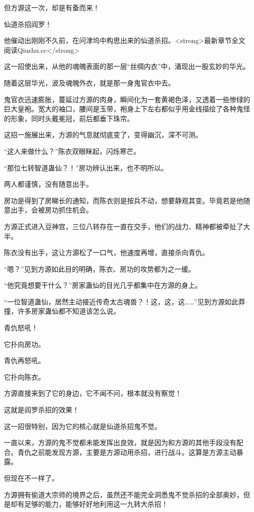 \begin{this_body}
但方源这一次，却是有备而来！

仙道杀招阎罗！

他催动出刚刚不久前，在问津坞中构思出来的仙道杀招。<strong>最新章节全文阅读Qiushu.cc</strong>

这一招使出来，从他的魂魄表面的那一层“丝绸内衣”中，涌现出一股玄妙的华光。

随着这层华光，波及魂魄外衣，就是那一身鬼官衣中去。

鬼官衣迅速膨胀，蔓延过方源的肉身，瞬间化为一套黄褐色泽，又透着一些惨绿的巨大皇袍。宽大的袖口，腰间是玉带，袍身上下左右都似乎用金线描绘了各种鬼怪的形象，同时头戴冕冠，前后都垂下珠帘。

这招一施展出来，方源的气息就彻底变了，变得幽沉，深不可测。

“这人来做什么？”陈衣双眼眯起，闪烁寒芒。

“那位七转智道蛊仙？！”房功辨认出来，也不明所以。

两人都谨慎，没有随意出手。

房功是得到了房睇长的通知，而陈衣则是按兵不动，想要静观其变。毕竟若是他随意出手，会被房功抓住机会。

方源正式进入豆神宫，三位八转存在一直在交手，他们的战力、精神都被牵扯了大半。

陈衣没有出手，这让方源松了一口气，他速度再增，直接杀向青仇。

“嗯？”见到方源如此目的明确，陈衣、房功的攻势都为之一缓。

“他究竟想要干什么？”房家蛊仙的目光几乎都集中在方源的身上。

“一位智道蛊仙，居然主动接近传奇太古魂兽？！这，这，这……”见到方源如此莽撞，许多房家蛊仙都不知道该怎么说。

青仇怒吼！

它扑向房功。

青仇再怒吼。

它扑向陈衣。

方源直接来到了它的身边，它不闻不问，根本就没有察觉！

这就是阎罗杀招的效果！

这一招很特别，因为它的核心就是仙道杀招鬼不觉。

一直以来，方源的鬼不觉都未能发挥出良效，就是因为和方源的其他手段没有配合。青仇之前能发现方源，主要是方源动用杀招，进行战斗。这算是方源主动暴露。

但现在不一样了。

方源拥有偷道大宗师的境界之后，虽然还不能完全洞悉鬼不觉杀招的全部奥妙，但是却有足够的能力，能够好好地利用这一九转大杀招！


\end{this_body}
